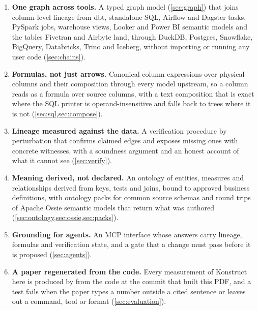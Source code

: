 \begin{enumerate}
  \item \textbf{One graph across tools.} A typed graph model (\cref{sec:graph}) that joins
  column-level lineage from dbt, standalone SQL, Airflow and Dagster tasks, PySpark jobs,
  warehouse views, Looker and Power BI semantic models and the tables Fivetran and Airbyte land,
  through DuckDB, Postgres, Snowflake, BigQuery, Databricks, Trino and Iceberg, without importing
  or running any user code (\cref{sec:chains}).
  \item \textbf{Formulas, not just arrows.} Canonical column expressions over physical columns
  and their composition through every model upstream, so a column reads as a formula over source
  columns, with a text composition that is exact where the SQL printer is operand-insensitive and
  falls back to trees where it is not (\cref{sec:sql,sec:compose}).
  \item \textbf{Lineage measured against the data.} A verification procedure by perturbation
  that confirms claimed edges and exposes missing ones with concrete witnesses, with a soundness
  argument and an honest account of what it cannot see (\cref{sec:verify}).
  \item \textbf{Meaning derived, not declared.} An ontology of entities, measures and
  relationships derived from keys, tests and joins, bound to approved business definitions, with
  ontology packs for common source schemas and round trips of Apache Ossie semantic models
  that return what was authored (\cref{sec:ontology,sec:ossie,sec:packs}).
  \item \textbf{Grounding for agents.} An MCP interface whose answers carry lineage, formulas and
  verification state, and a gate that a change must pass before it is proposed
  (\cref{sec:agents}).
  \item \textbf{A paper regenerated from the code.} Every measurement of Konstruct here is produced by
   from the code at the commit that built this PDF, and a test fails when
  the paper types a number outside a cited sentence or leaves out a command, tool or format
  (\cref{sec:evaluation}).
\end{enumerate}
